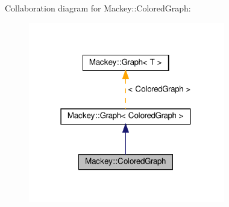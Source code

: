 Collaboration diagram for Mackey\+:\+:Colored\+Graph\+:\nopagebreak
\begin{figure}[H]
\begin{center}
\leavevmode
\includegraphics[width=243pt]{classMackey_1_1ColoredGraph__coll__graph}
\end{center}
\end{figure}
